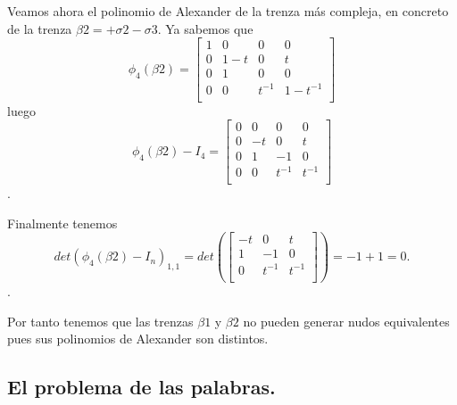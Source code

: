 \documentclass[14pt]{extarticle}
\begin{document}
Veamos ahora el polinomio de Alexander de la trenza más compleja, en concreto de la trenza $\beta2 = +\sigma2-\sigma3$. Ya sabemos que 
 \[ \phi_{4} (\beta2) = \begin{bmatrix}
 1 & 0 & 0 & 0 \\
 0 & 1-t & 0 & t \\
 0 & 1 & 0 & 0  \\	
 0 & 0 & t^{-1} & 1-t^{-1} \\
 \end{bmatrix}\]
 luego
  \[ \phi_{4} (\beta2) - I_{4} = \begin{bmatrix}
  0 & 0 & 0 & 0 \\
  0 & -t & 0 & t \\
  0 & 1 & -1 & 0  \\	
  0 & 0 & t^{-1} & t^{-1} \\
  \end{bmatrix}\].
  
  Finalmente tenemos 
    \[ det(\phi_{4} (\beta2) - I_{n})_{1,1} = det(\begin{bmatrix}
    -t & 0 & t \\
     1 & -1 & 0  \\	
     0 & t^{-1} & t^{-1} \\
    \end{bmatrix}) = -1+1 = 0.\].
    
Por tanto tenemos que las trenzas $\beta1$ y $\beta2$ no pueden generar nudos equivalentes pues sus polinomios de Alexander son distintos.\\
    


\newpage
\subsection{El problema de las palabras.}
\end{document}
